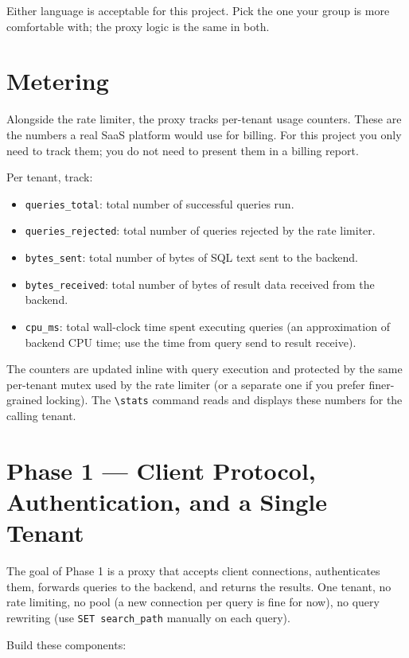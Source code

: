 \documentclass[11pt,a4paper]{article}
\begin{document}
Either language is acceptable for this project. Pick the one your group is more comfortable with; the proxy logic is the same in both.

\section{Metering}

Alongside the rate limiter, the proxy tracks per-tenant usage counters. These are the numbers a real SaaS platform would use for billing. For this project you only need to track them; you do not need to present them in a billing report.

Per tenant, track:

\begin{itemize}
\item \texttt{queries\_total}: total number of successful queries run.
\item \texttt{queries\_rejected}: total number of queries rejected by the rate limiter.
\item \texttt{bytes\_sent}: total number of bytes of SQL text sent to the backend.
\item \texttt{bytes\_received}: total number of bytes of result data received from the backend.
\item \texttt{cpu\_ms}: total wall-clock time spent executing queries (an approximation of backend CPU time; use the time from query send to result receive).
\end{itemize}

The counters are updated inline with query execution and protected by the same per-tenant mutex used by the rate limiter (or a separate one if you prefer finer-grained locking). The \verb|\stats| command reads and displays these numbers for the calling tenant.

\section{Phase 1 --- Client Protocol, Authentication, and a Single Tenant}

The goal of Phase 1 is a proxy that accepts client connections, authenticates them, forwards queries to the backend, and returns the results. One tenant, no rate limiting, no pool (a new connection per query is fine for now), no query rewriting (use \texttt{SET search\_path} manually on each query).

Build these components:
\end{document}
